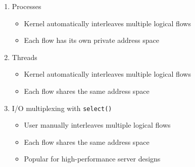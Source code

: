 \documentclass[number]{notes}
\begin{document}
\begin{landscape}
\begin{multicols}{3}
\begin{enumerate}[nolistsep]
    \item Processes
    \begin{itemize}[nolistsep]
        \item Kernel automatically interleaves multiple logical flows
        \item Each flow has its own private address space
    \end{itemize}
    \item Threads
    \begin{itemize}[nolistsep]
        \item Kernel automatically interleaves multiple logical flows
        \item Each flow shares the same address space
    \end{itemize}
    \item I/O multiplexing with \texttt{select()}
    \begin{itemize}[nolistsep]
        \item User manually interleaves multiple logical flows
        \item Each flow shares the same address space
        \item Popular for high-performance server designs
    \end{itemize}
\end{enumerate}

\end{multicols}
\end{landscape}
\end{document}
